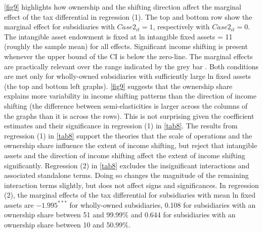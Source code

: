 \documentclass[10pt,twocolumn,oneside,cmyk]{article}
\begin{document}
\cref{fig9} highlights how ownership and the shifting direction affect the marginal effect of the tax differential in regression (1). The top and bottom row show the marginal effect for subsidiaries with $Case2_{it} = 1$, respectively with $Case2_{it} = 0$. The intangible asset endowment is fixed at ln intangible fixed assets = 11 (roughly the sample mean) for all effects. Significant income shifting is present whenever the upper bound of the CI is below the zero-line. The marginal effects are practically relevant over the range indicated by the grey bar \parencite[661]{berry_improving_2012}. Both conditions are met only for wholly-owned subsidiaries with sufficiently large ln fixed assets (the top and bottom left graphs). \cref{fig9} suggests that the ownership share explains more variability in income shifting patterns than the direction of income shifting (the difference between semi-elasticities is larger across the columns of the graphs than it is across the rows). This is not surprising given the coefficient estimates and their significance in regression (1) in \cref{tab8}. The results from regression (1) in \cref{tab8} support the theories that the scale of operations and the ownership share influence the extent of income shifting, but reject that intangible assets and the direction of income shifting affect the extent of income shifting significantly. Regression (2) in \cref{tab8} excludes the insignificant interactions and associated standalone terms. Doing so changes the magnitude of the remaining interaction terms slightly, but does not affect signs and significances. In regression (2), the marginal effects of the tax differential for subsidiaries with mean ln fixed assets are $-1.995^{***}$ for wholly-owned subsidiaries, 0.108 for subsidiaries with an ownership share between 51 and 99.99\% and 0.644 for subsidiaries with an ownership share between 10 and 50.99\%.
\end{document}
